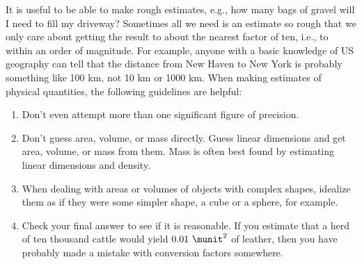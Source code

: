 It is useful to be able to make rough estimates, e.g., how many bags of
gravel will I need to fill my driveway? Sometimes all we need is an estimate
so rough that we only care about getting the result to about the nearest factor
of ten, i.e., to within an order of magnitude. For example, anyone with a basic
knowledge of US geography can tell that the distance from New Haven to New York
is probably something like 100 km, not 10 km or 1000 km. When making estimates
of physical quantities, the following guidelines are helpful:

\begin{enumerate}
\item Don't even attempt more than one significant figure of precision.

\item Don't guess area, volume, or mass directly. Guess linear
dimensions and get area, volume, or mass from them. Mass is often best
found by estimating linear dimensions and density.

\item When dealing with areas or volumes of objects with
complex shapes, idealize them as if they were some simpler
shape, a cube or a sphere, for example.

\item Check your final answer to see if it is reasonable. If
you estimate that a herd of ten thousand cattle would yield
$0.01\ \munit^2$ of leather, then you have probably made a mistake
with conversion factors somewhere.
\end{enumerate}
